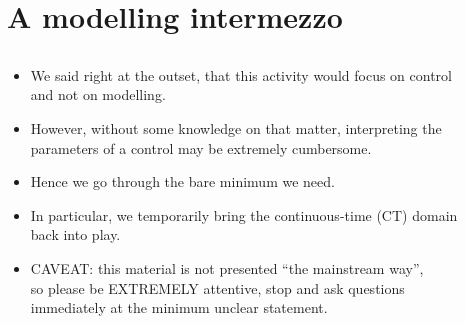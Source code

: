 \section{A modelling intermezzo}
\subsection{}

\begin{frame}
\framesubtitleTC{}
\myPause
 \begin{itemize}[<+-| alert@+>]
 \item We said right at the outset, that this activity would focus on control\\
       and not on modelling.
 \item However, without some knowledge on that matter, interpreting the\\
       parameters of a control may be extremely cumbersome.
 \item Hence we go through the bare minimum we need.
 \item In particular, we temporarily bring the continuous-time (CT) domain\\
       back into play.
 \item \vfill CAVEAT: this material is not presented ``the mainstream way'',\\
       so please be EXTREMELY attentive, stop and ask questions\\
       immediately at the minimum unclear statement.
 \end{itemize}
\end{frame}


